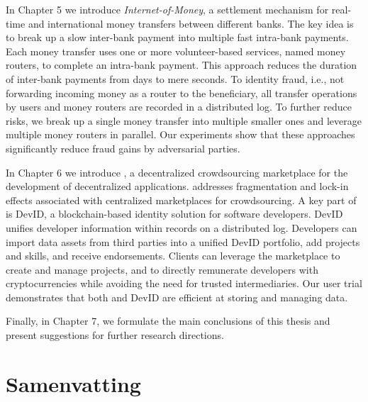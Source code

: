 In Chapter 5 we introduce \emph{Internet-of-Money}, a settlement mechanism for real-time and international money transfers between different banks.
The key idea is to break up a slow inter-bank payment into multiple fast intra-bank payments.
Each money transfer uses one or more volunteer-based services, named money routers, to complete an intra-bank payment.
This approach reduces the duration of inter-bank payments from days to mere seconds.
To identity fraud, i.e., not forwarding incoming money as a router to the beneficiary, all transfer operations by users and money routers are recorded in a distributed log.
To further reduce risks, we break up a single money transfer into multiple smaller ones and leverage multiple money routers in parallel.
Our experiments show that these approaches significantly reduce fraud gains by adversarial parties.

In Chapter 6 we introduce \emph{\Dappcoder{}}, a decentralized crowdsourcing marketplace for the development of decentralized applications.
\Dappcoder{} addresses fragmentation and lock-in effects associated with centralized marketplaces for crowdsourcing.
A key part of \Dappcoder{} is DevID, a blockchain-based identity solution for software developers.
DevID unifies developer information within records on a distributed log.
Developers can import data assets from third parties into a unified DevID portfolio, add projects and skills, and receive endorsements.
Clients can leverage the \Dappcoder{} marketplace to create and manage projects, and to directly remunerate developers with cryptocurrencies while avoiding the need for trusted intermediaries.
Our user trial demonstrates that both \Dappcoder{} and DevID are efficient at storing and managing data.

Finally, in Chapter 7, we formulate the main conclusions of this thesis and present suggestions for further research directions.

\chapter*{Samenvatting}


